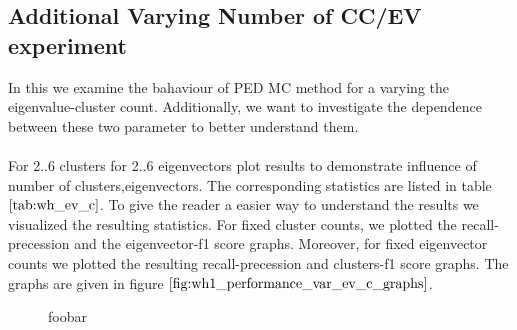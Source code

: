 \subsection{Additional Varying Number of CC/EV experiment}
\label{sec:additional_cc_ev_exp}
In this we examine the bahaviour of PED MC method for a varying the eigenvalue-cluster count. Additionally, we want to investigate the dependence between these two parameter to better understand them. \\ \\
For 2..6 clusters for 2..6 eigenvectors plot results to demonstrate influence
of number of clusters,eigenvectors. The corresponding statistics are listed in table $\ref{tab:wh_ev_c}$. To give the reader a easier way to understand the results we visualized the resulting statistics. For fixed cluster counts, we plotted the recall-precession and the eigenvector-f1 score graphs. Moreover, for fixed eigenvector counts we plotted the resulting recall-precession and clusters-f1 score graphs. The graphs are given in figure $\ref{fig:wh1_performance_var_ev_c_graphs}$.
\begin{figure}[H]
\begin{center}
\end{center}
\caption[Plot Performance Varying CLuster/Eigenvectors]{foobar}
\label{fig:wh1_performance_var_ev_c_graphs}
\end{figure}
